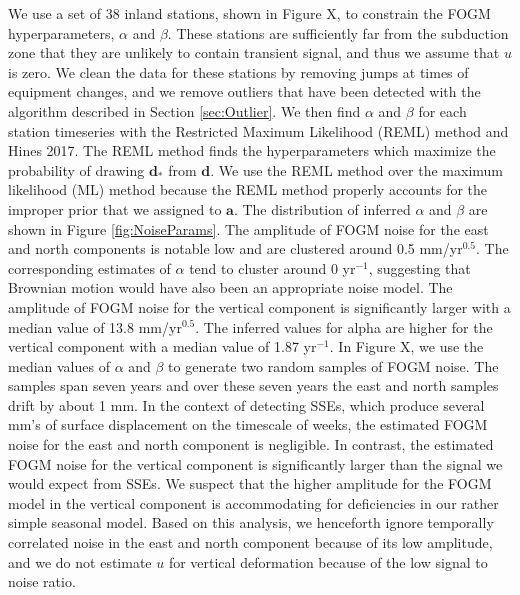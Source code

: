 \documentclass[10pt,a4paper]{article}
\begin{document}
We use a set of 38 inland stations, shown in Figure X, to constrain the FOGM hyperparameters, $\alpha$ and $\beta$.  These stations are sufficiently far from the subduction zone that they are unlikely to contain transient signal, and thus we assume that $u$ is zero.  We clean the data for these stations by removing jumps at times of equipment changes, and we remove outliers that have been detected with the algorithm described in Section \ref{sec:Outlier}. We then find $\alpha$ and $\beta$ for each station timeseries with the Restricted Maximum Likelihood (REML) method \cite[e.g.,][]{Harville1974,Cressie1992} and Hines 2017. The REML method finds the hyperparameters which maximize the probability of drawing $\bm{d}_*$ from $\bm{d}$. We use the REML method over the maximum likelihood (ML) method \citep[e.g.,][]{Langbein1997} because the REML method properly accounts for the improper prior that we assigned to $\bm{a}$. The distribution of inferred $\alpha$ and $\beta$ are shown in Figure \ref{fig:NoiseParams}. The amplitude of FOGM noise for the east and north components is notable low and are clustered around 0.5 mm/yr$^{0.5}$. The corresponding estimates of $\alpha$ tend to cluster around 0 yr$^{-1}$, suggesting that Brownian motion would have also been an appropriate noise model.  The amplitude of FOGM noise for the vertical component is significantly larger with a median value of 13.8 mm/yr$^{0.5}$. The inferred values for alpha are higher for the vertical component with a median value of 1.87 yr$^{-1}$. In Figure X, we use the median values of $\alpha$ and $\beta$ to generate two random samples of FOGM noise. The samples span seven years and over these seven years the east and north samples drift by about 1 mm. In the context of detecting SSEs, which produce several mm's of surface displacement on the timescale of weeks, the estimated FOGM noise for the east and north component is negligible. In contrast, the estimated FOGM noise for the vertical component is significantly larger than the signal we would expect from SSEs. We suspect that the higher amplitude for the FOGM model in the vertical component is accommodating for deficiencies in our rather simple seasonal model. Based on this analysis, we henceforth ignore temporally correlated noise in the east and north component because of its low amplitude, and we do not estimate $u$ for vertical deformation because of the low signal to noise ratio.
\end{document}
